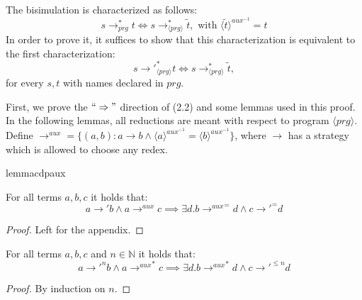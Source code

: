 The bisimulation is characterized as follows:
\[
s {\longrightarrow}_{prg}^* t \iff s \longrightarrow^*_{\langle prg \rangle} \widetilde{t}, \text{ with } \langle \widetilde{t} \rangle^{aux^{-1}} = t
\]
In order to prove it, it suffices to show that this characterization is equivalent to the first characterization:
\begin{equation}
s {\longrightarrow'}_{\langle prg \rangle}^* t \iff s \longrightarrow^*_{\langle prg \rangle} \widetilde{t},
\end{equation}
for every $s, t$ with names declared in $prg$.

First, we prove the $`` \Rightarrow "$ direction of (2.2) and some lemmas used in this proof. In the following lemmas, all reductions are meant with respect to program $\langle prg \rangle$. Define $\longrightarrow^{aux} = \{(a,b) : a \longrightarrow b \land \langle a \rangle^{aux^{-1}} = \langle b \rangle^{aux^{-1}}\}$, where $\longrightarrow$ has a strategy which is allowed to choose any redex.

\begin{restatable}{lemma}{cdpaux}

For all terms $a,b,c$ it holds that:
\[
a {\longrightarrow'} b \land a \longrightarrow^{aux} c \implies \exists d . b {\longrightarrow^{aux}}^= d \land c {\longrightarrow'}^= d
\]

\end{restatable}
\begin{proof}
Left for the appendix.
\end{proof}

\begin{corollary}

For all terms $a,b,c$ and $n \in \mathbb{N}$ it holds that:
\[
a {\longrightarrow'}^n b \land a {\longrightarrow^{aux}}^* c \implies \exists d . b {\longrightarrow^{aux}}^* d \land c {\longrightarrow'}^{\leq n} d
\]

\begin{proof}

By induction on $n$.

\end{proof}

\end{corollary}

